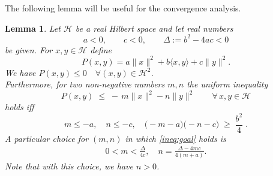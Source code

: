 \documentclass[11pt]{article}
\numberwithin{equation}{section}
\newtheorem{lemma}{Lemma}[section]
\begin{document}
The following lemma will be useful for the convergence analysis.
\begin{lemma}
\label{lemma:diag-majorant}
Let $\mathcal H$ be a real Hilbert space and let real numbers
\[
a<0,\qquad c<0,\qquad \Delta:=b^{2}-4ac<0
\]
be given.
For $x,y\in\mathcal H$ define
\[
P(x,y)=a\|x\|^{2}+b\langle x,y\rangle+c\|y\|^{2}.
\]
We have $P(x,y) \le 0 \quad \forall (x,y) \in \mathcal{H}^2$. \\
Furthermore, for two non-negative numbers $m,n$ the uniform inequality
\begin{equation}\label{ineq:goal}
P(x,y)\;\le\;-\,m\|x\|^{2}-n\|y\|^{2}\qquad\forall\,x,y\in\mathcal H
\end{equation}
holds {iff}
\begin{equation}\label{ineq:mn-conditions}
m\le -a,\quad n\le -c,\quad
\bigl(-m-a\bigr)\bigl(-n-c\bigr)\;\ge\;\frac{b^{2}}{4}\;.
\end{equation}
A particular choice for $(m,n)$ in which \eqref{ineq:goal} holds is
\begin{align*}
    0<m<\frac{\Delta}{4c}, \quad n=\frac{\Delta-4mc}{4(m+a)}.
\end{align*}
Note that with this choice, we have $n>0$.
\end{lemma}
\end{document}
